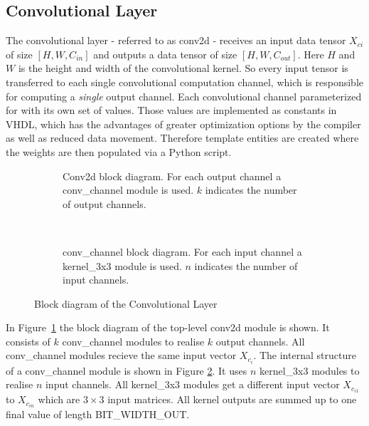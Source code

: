 \subsection{Convolutional Layer}

The convolutional layer - referred to as conv2d - receives an input data tensor $X_{ci} $ of size $[H, W, C_{in}]$ and outputs a data tensor of size $[H,W,C_{out}]$. Here $H$ and $W$ is the height and width of the convolutional kernel. So every input tensor is transferred to each single convolutional computation channel, which is responsible for computing a \emph{single} output channel. Each convolutional channel parameterized for with its own set of values. Those values are implemented as constants in VHDL, which has the advantages of greater optimization options by the compiler as well as reduced data movement. Therefore template entities are created where the weights are then populated via a Python script.

\begin{figure}[h]
	\centering
	\begin{subfigure}[t]{0.5\textwidth}
		\centering
		
		\caption[Conv2d block diagram.]{Conv2d block diagram. For each output channel a conv\_channel module is used. $k$ indicates the number of output channels.}
		\label{fig:conv2d}
	\end{subfigure}%
	~
	\begin{subfigure}[t]{0.5\textwidth}
		\centering
		
		\caption[conv\_channel block diagram.]{conv\_channel block diagram. For each input channel a kernel\_3x3 module is used. $n$ indicates the number of input channels.}
		\label{fig:conv-channel}		
	\end{subfigure}
	\caption{Block diagram of the Convolutional Layer}
	\label{fig:hw-layer-conv}
\end{figure}


In Figure~\ref{fig:conv2d} the block diagram of the top-level conv2d module is shown. It consists of $k$ conv\_channel modules to realise $k$ output channels. All conv\_channel modules recieve the same input vector $X_{c_i}$. 
The internal structure of a conv\_channel module is shown in Figure \ref{fig:conv-channel}. It uses $n$ kernel\_3x3 modules to realise $n$ input channels. All kernel\_3x3 modules get a different input vector $X_{c_{i1}}$ to $X_{c_{in}}$ which are $3 \times 3$ input matrices. All kernel outputs are summed up to one final value of length BIT\_WIDTH\_OUT.

